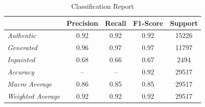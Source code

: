 \begin{table}[h!t]
  \caption{Classification Report}
  \begin{center}
    \begin{tabularx}{\linewidth}{Ycccc}
      \toprule
                                &\textbf{Precision} &\textbf{Recall} &\textbf{F1-Score} &\textbf{Support} \\

      \midrule
      \textit{Authentic}        & 0.92              & 0.92           & 0.92             & 15226 \\
      \textit{Generated}        & 0.96              & 0.97           & 0.97             & 11797 \\
      \textit{Inpainted}        & 0.68              & 0.66           & 0.67             & 2494 \\
      \midrule
      \textit{Accuracy}         & --                & --             & 0.92             & 29517 \\
      \textit{Macro Average}    & 0.86              & 0.85           & 0.85             & 29517 \\
      \textit{Weighted Average} & 0.92              & 0.92           & 0.92             & 29517 \\
      \bottomrule
    \end{tabularx}
    \label{table:classification_report}
  \end{center}
\end{table}

